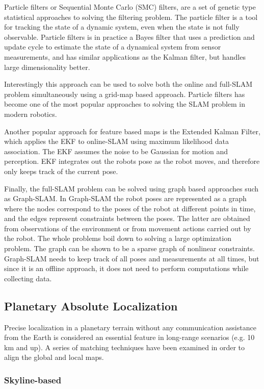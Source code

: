 Particle filters or Sequential Monte Carlo (SMC) filters, are a set of
genetic type statistical approaches to solving the filtering problem.
The particle filter is a tool for tracking the state of a dynamic system,
even when the state is not fully observable.
Particle filters is in practice a Bayes filter that uses a prediction
and update cycle to estimate the state of a dynamical system from
sensor measurements, and has similar applications as the Kalman filter,
but handles large dimensionality better.

Interestingly this approach can be used to solve both the online and
full-SLAM problem simultaneously using a grid-map based approach.
Particle filters has become one of the most popular approaches to
solving the SLAM problem in modern robotics.

Another popular approach for feature based maps is the Extended Kalman Filter,
which applies the EKF to online-SLAM using maximum likelihood data association.
The EKF assumes the noise to be Gaussian for motion and perception.
EKF integrates out the robots pose as the robot moves, and therefore only
keeps track of the current pose.

Finally, the full-SLAM problem can be solved using graph based approaches
such as Graph-SLAM.
In Graph-SLAM the robot poses are represented as a graph where the
nodes correspond to the poses of the robot at different points in time,
and the edges represent constraints between the poses.
The latter are obtained from observations of the environment or from
movement actions carried out by the robot.
The whole problems boil down to solving a large optimization problem.
The graph can be shown to be a sparse graph of nonlinear constraints.
Graph-SLAM needs to keep track of all poses and measurements at all times,
but since it is an offline approach, it does not need to perform computations
while collecting data.

\subsection{Planetary Absolute Localization}

Precise localization in a planetary terrain without any communication
assistance from the Earth is considered an essential feature in
long-range scenarios (e.g. 10 km and up).
A series of matching techniques have been examined in order to align the
global and local maps.

\subsubsection{Skyline-based}

